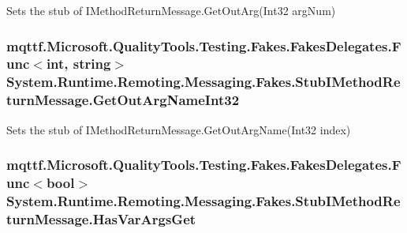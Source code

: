 Sets the stub of I\-Method\-Return\-Message.\-Get\-Out\-Arg(\-Int32 arg\-Num)

\hypertarget{class_system_1_1_runtime_1_1_remoting_1_1_messaging_1_1_fakes_1_1_stub_i_method_return_message_a19147134e1d385a9b32b90295df5316a}{
\subsubsection[{Get\-Out\-Arg\-Name\-Int32}]{\setlength{\rightskip}{0pt plus 5cm}mqttf.\-Microsoft.\-Quality\-Tools.\-Testing.\-Fakes.\-Fakes\-Delegates.\-Func$<$int, string$>$ System.\-Runtime.\-Remoting.\-Messaging.\-Fakes.\-Stub\-I\-Method\-Return\-Message.\-Get\-Out\-Arg\-Name\-Int32}}\label{class_system_1_1_runtime_1_1_remoting_1_1_messaging_1_1_fakes_1_1_stub_i_method_return_message_a19147134e1d385a9b32b90295df5316a}


Sets the stub of I\-Method\-Return\-Message.\-Get\-Out\-Arg\-Name(\-Int32 index)

\hypertarget{class_system_1_1_runtime_1_1_remoting_1_1_messaging_1_1_fakes_1_1_stub_i_method_return_message_abcb9b7025fc2c1b544512adee3b97821}{
\subsubsection[{Has\-Var\-Args\-Get}]{\setlength{\rightskip}{0pt plus 5cm}mqttf.\-Microsoft.\-Quality\-Tools.\-Testing.\-Fakes.\-Fakes\-Delegates.\-Func$<$bool$>$ System.\-Runtime.\-Remoting.\-Messaging.\-Fakes.\-Stub\-I\-Method\-Return\-Message.\-Has\-Var\-Args\-Get}}\label{class_system_1_1_runtime_1_1_remoting_1_1_messaging_1_1_fakes_1_1_stub_i_method_return_message_abcb9b7025fc2c1b544512adee3b97821}



